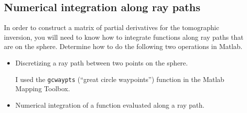 \documentclass[11pt,titlepage,fleqn]{article}
\begin{document}
\subsection*{Numerical integration along ray paths}

In order to construct a matrix of partial derivatives for the tomographic inversion, you will need to know how to integrate functions along ray paths that are on the sphere. Determine how to do the following two operations in Matlab.

\begin{itemize}
\item Discretizing a ray path between two points on the sphere.

I used the \verb+gcwaypts+ (``great circle waypoints'') function in the Matlab Mapping Toolbox.

\item Numerical integration of a function evaluated along a ray path.

\end{itemize}




\end{document}
